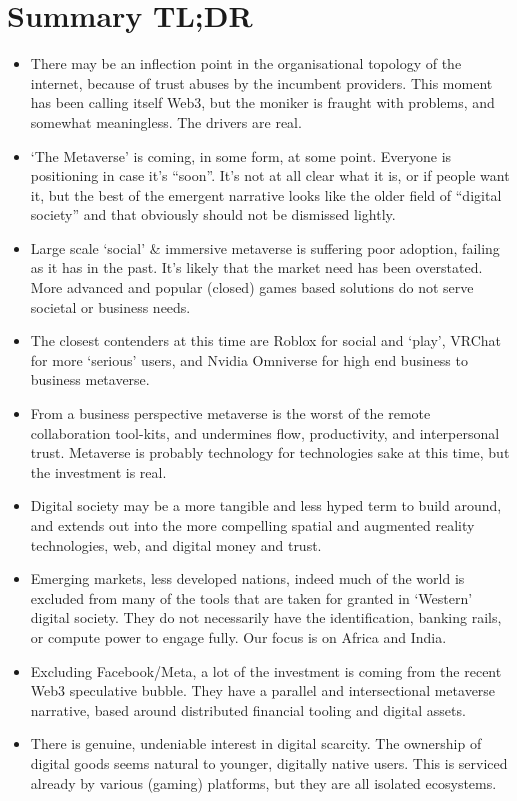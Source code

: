 \section{Summary TL;DR}
\label{sec:tldr}
\begin{itemize}
\item There may be an inflection point in the organisational topology of the internet, because of trust abuses by the incumbent providers. This moment has been calling itself Web3, but the moniker is fraught with problems, and somewhat meaningless. The drivers are real.
\item `The Metaverse' is coming, in some form, at some point. Everyone is positioning in case it's ``soon''. It's not at all clear what it is, or if people want it, but the best of the emergent narrative looks like the older field of ``digital society'' and that obviously should not be dismissed lightly.
\item Large scale `social' \& immersive metaverse is suffering poor adoption, failing as it has in the past. It's likely that the market need has been overstated. More advanced and popular (closed) games based solutions do not serve societal or business needs.
\item The closest contenders at this time are Roblox for social and `play', VRChat for more `serious' users, and Nvidia Omniverse for high end business to business metaverse.
\item From a business perspective metaverse is the worst of the remote collaboration tool-kits, and undermines flow, productivity, and interpersonal trust. Metaverse is probably technology for technologies sake at this time, but the investment is real. 
\item Digital society may be a more tangible and less hyped term to build around, and extends out into the more compelling spatial and augmented reality technologies, web, and digital money and trust.
\item Emerging markets, less developed nations, indeed much of the world is excluded from many of the tools that are taken for granted in `Western' digital society. They do not necessarily have the identification, banking rails, or compute power to engage fully. Our focus is on Africa and India.
\item Excluding Facebook/Meta, a lot of the investment is coming from the recent Web3 speculative bubble. They have a parallel and intersectional metaverse narrative, based around distributed financial tooling and digital assets. 
\item There is genuine, undeniable interest in digital scarcity. The ownership of digital goods seems natural to younger, digitally native users. This is serviced already by various (gaming) platforms, but they are all isolated ecosystems.

\end{itemize}
